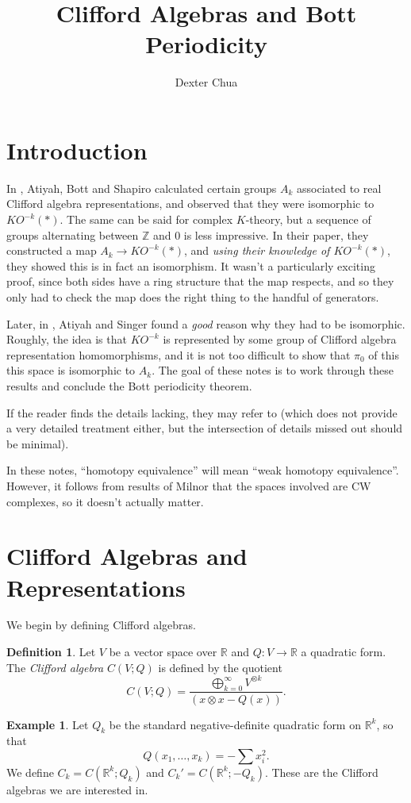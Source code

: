 \documentclass{shortart}
\title{Clifford Algebras and Bott Periodicity}
\author{Dexter Chua}
\theoremstyle{definition}
\newtheorem*{defi}{Definition}
\newtheorem*{eg}{Example}
\newcommand\R{\mathbb{R}}
\newcommand\Z{\mathbb{Z}}
\begin{document}
\section{Introduction}
In \cite{abs1964}, Atiyah, Bott and Shapiro calculated certain groups $A_k$ associated to real Clifford algebra representations, and observed that they were isomorphic to $KO^{-k}(*)$. The same can be said for complex $K$-theory, but a sequence of groups alternating between $\Z$ and $0$ is less impressive. In their paper, they constructed a map $A_k \to KO^{-k}(*)$, and \emph{using their knowledge of $KO^{-k}(*)$}, they showed this is in fact an isomorphism. It wasn't a particularly exciting proof, since both sides have a ring structure that the map respects, and so they only had to check the map does the right thing to the handful of generators.

Later, in \cite{atiyahsinger1969}, Atiyah and Singer found a \emph{good} reason why they had to be isomorphic. Roughly, the idea is that $KO^{-k}$ is represented by some group of Clifford algebra representation homomorphisms, and it is not too difficult to show that $\pi_0$ of this this space is isomorphic to $A_k$. The goal of these notes is to work through these results and conclude the Bott periodicity theorem.

If the reader finds the details lacking, they may refer to \cite{atiyahsinger1969} (which does not provide a very detailed treatment either, but the intersection of details missed out should be minimal).

In these notes, ``homotopy equivalence'' will mean ``weak homotopy equivalence''. However, it follows from results of Milnor \cite{milnor1959} that the spaces involved are CW complexes, so it doesn't actually matter.
\section{Clifford Algebras and Representations}
We begin by defining Clifford algebras.

\begin{defi}
  Let $V$ be a vector space over $\R$ and $Q: V \to \R$ a quadratic form. The \emph{Clifford algebra} $C(V; Q)$ is defined by the quotient
  \[
    C(V; Q) = \frac{\bigoplus_{k = 0}^\infty V^{\otimes k}}{(x \otimes x - Q(x))}.
  \]
\end{defi}

\begin{eg}
  Let $Q_k$ be the standard negative-definite quadratic form on $\R^k$, so that
  \[
    Q(x_1, \ldots, x_k) = - \sum x_i^2.
  \]
  We define $C_k = C(\R^k; Q_k)$ and $C_k' = C(\R^k; -Q_k)$. These are the Clifford algebras we are interested in.
\end{eg}
\end{document}
